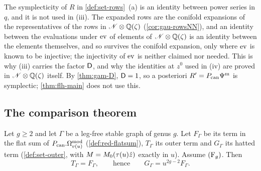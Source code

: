 The symplecticity of $R$ in \cref{def:set-rows}~(a) is an identity between power series in $q$, and it is not used in (iii). The expanded rows are the conifold expansions of the representatives of the rows in $\mathscr{N}\otimes\mathbb{Q}(\zeta)$ (\cref{cor:gau-rowsNN}), and an identity between the evaluations under $\operatorname{ev}$ of elements of $\mathscr{N}\otimes\mathbb{Q}(\zeta)$ is an identity between the elements themselves, and so survives the conifold expansion, only where $\operatorname{ev}$ is known to be injective; the injectivity of $\operatorname{ev}$ is neither claimed nor needed. This is why (iii) carries the factor $\mathsf{D}$, and why the identities at $z^0$ used in (iv) are proved in $\mathscr{N}\otimes\mathbb{Q}(\zeta)$ itself. By \cref{thm:gam-D}, $\mathsf{D}=1$, so a posteriori $R'=P_{\mathrm{can}}\Psi^{\mathrm m}$ is symplectic; \cref{thm:flh-main} does not use this.

\subsection{The comparison theorem}
\label{sec:flh-thm}

\begin{thm}
\label{thm:flh-main}
Let $g\geq 2$ and let $\Gamma$ be a leg-free stable graph of genus $g$. Let $F_\Gamma$ be its term in the flat sum of $P_{\mathrm{can}}.\Omega^{\mathrm{mod}}_{v(u)}$ (\cref{def:red-flatsum}), $T_\Gamma$ its outer term and $G_\Gamma$ its hatted term (\cref{def:set-outer}, with $M=M_{0}(\tau(u)\hat{z})$ exactly in $u$). Assume $(\mathrm{F}_{g})$. Then
\begin{equation}
\label{eq:flh-main}
T_\Gamma=F_\Gamma,\qquad\text{hence}\qquad G_\Gamma=u^{2g-2}F_\Gamma .
\end{equation}
\end{thm}

